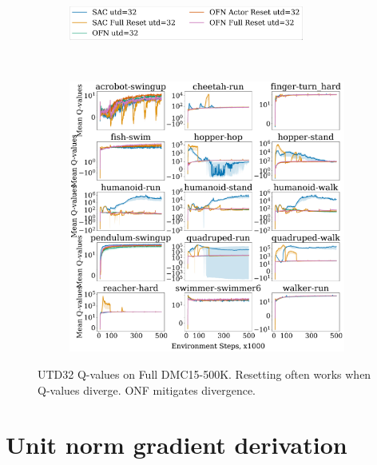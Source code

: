 \begin{figure}[H]
\centering
    \begin{subfigure}[b]{0.8\textwidth}
        \centering
        \includegraphics[height=1.1cm]{figures/dissecting/main_exp/utd_32_Q_legend.pdf}
    \end{subfigure}\\%
    \begin{subfigure}[b]{1\textwidth}
        \centering
        \includegraphics[width=15cm, trim=0cm 0cm 0cm 0cm ,clip]{figures/dissecting/main_exp/utd_32_Q.pdf}
    \end{subfigure}%
    \vspace{-5pt}
    \caption{UTD32 Q-values on Full DMC15-500K. Resetting often works when Q-values diverge. ONF mitigates divergence.}
    \label{fig:utd32_Q}
\end{figure}

\newpage

\section{Unit norm gradient derivation} \label{app:unitnorm}


